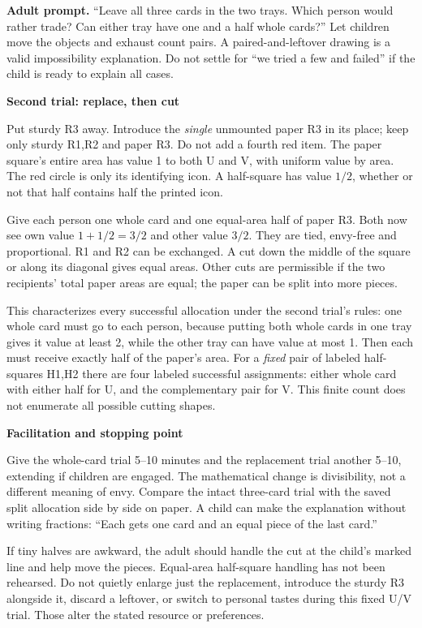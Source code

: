\documentclass[11pt]{article}
\newcommand{\subhead}[1]{\par\vspace{1mm}\textbf{#1}\par}
\newcommand{\adult}[1]{\textbf{Adult prompt.} #1\par}
\begin{document}
\adult{``Leave all three cards in the two trays. Which person would rather trade? Can either tray have one and a half whole cards?'' Let children move the objects and exhaust count pairs. A paired-and-leftover drawing is a valid impossibility explanation. Do not settle for ``we tried a few and failed'' if the child is ready to explain all cases.}

\subhead{Second trial: replace, then cut}
Put sturdy R3 away. Introduce the \emph{single} unmounted paper R3 in its place; keep only sturdy R1,R2 and paper R3. Do not add a fourth red item. The paper square's entire area has value 1 to both U and V, with uniform value by area. The red circle is only its identifying icon. A half-square has value $1/2$, whether or not that half contains half the printed icon.

Give each person one whole card and one equal-area half of paper R3. Both now see own value $1+1/2=3/2$ and other value $3/2$. They are tied, envy-free and proportional. R1 and R2 can be exchanged. A cut down the middle of the square or along its diagonal gives equal areas. Other cuts are permissible if the two recipients' total paper areas are equal; the paper can be split into more pieces.

This characterizes every successful allocation under the second trial's rules: one whole card must go to each person, because putting both whole cards in one tray gives it value at least 2, while the other tray can have value at most 1. Then each must receive exactly half of the paper's area. For a \emph{fixed} pair of labeled half-squares H1,H2 there are four labeled successful assignments: either whole card with either half for U, and the complementary pair for V. This finite count does not enumerate all possible cutting shapes.

\subhead{Facilitation and stopping point}
Give the whole-card trial 5--10 minutes and the replacement trial another 5--10, extending if children are engaged. The mathematical change is divisibility, not a different meaning of envy. Compare the intact three-card trial with the saved split allocation side by side on paper. A child can make the explanation without writing fractions: ``Each gets one card and an equal piece of the last card.''

If tiny halves are awkward, the adult should handle the cut at the child's marked line and help move the pieces. Equal-area half-square handling has not been rehearsed. Do not quietly enlarge just the replacement, introduce the sturdy R3 alongside it, discard a leftover, or switch to personal tastes during this fixed U/V trial. Those alter the stated resource or preferences.
\end{document}
